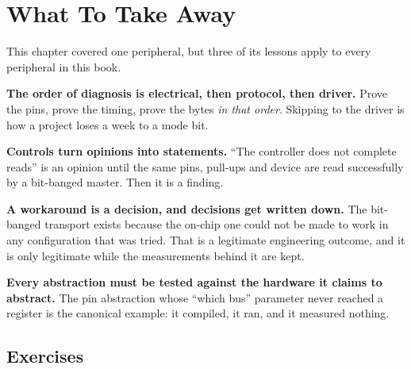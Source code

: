\section{What To Take Away}
\label{sec:i2c-takeaways}

This chapter covered one peripheral, but three of its lessons apply to every peripheral in
this book.

\begin{keytakeaways}
    \item \textbf{The order of diagnosis is electrical, then protocol, then driver.} Prove the
          pins, prove the timing, prove the bytes \emph{in that order}. Skipping to the driver
          is how a project loses a week to a mode bit.
    \item \textbf{Controls turn opinions into statements.} ``The controller does not complete
          reads'' is an opinion until the same pins, pull-ups and device are read successfully
          by a bit-banged master. Then it is a finding.
    \item \textbf{A workaround is a decision, and decisions get written down.} The
          bit-banged transport exists because the on-chip one could not be made to work in
          any configuration that was tried. That is a legitimate engineering outcome, and it
          is only legitimate while the measurements behind it are kept.
    \item \textbf{Every abstraction must be tested against the hardware it claims to
          abstract.} The pin abstraction whose ``which bus'' parameter never reached a
          register is the canonical example: it compiled, it ran, and it measured nothing.
\end{keytakeaways}

\subsection{Exercises}

